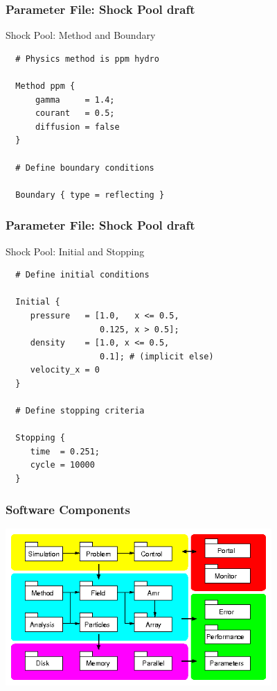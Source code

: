 \documentclass{beamer}
\begin{document}
    \begin{frame}[fragile] \frametitle{Parameter File: Shock Pool draft}
 \footnotesize
\begin{block}{Shock Pool: Method and Boundary}
      \begin{verbatim}
  # Physics method is ppm hydro
 
  Method ppm {
      gamma     = 1.4;
      courant   = 0.5;
      diffusion = false
  }
 
  # Define boundary conditions
 
  Boundary { type = reflecting }
      \end{verbatim}
\end{block}
\end{frame}

    \begin{frame}[fragile] \frametitle{Parameter File: Shock Pool draft}
 \footnotesize
\begin{block}{Shock Pool: Initial and Stopping}
      \begin{verbatim}
  # Define initial conditions
 
  Initial {
     pressure   = [1.0,   x <= 0.5,
                   0.125, x > 0.5];
     density    = [1.0, x <= 0.5,
                   0.1]; # (implicit else)
     velocity_x = 0
  }
 
  # Define stopping criteria
 
  Stopping {
     time  = 0.251;
     cycle = 10000
  }
      \end{verbatim}
\end{block}
\end{frame}

    \begin{frame}[fragile] \frametitle{Software Components}
\centerline{\includegraphics[width=4in]{components.png}}
\end{frame}
\end{document}
